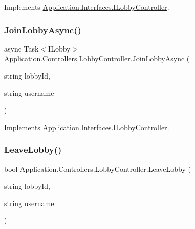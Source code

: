 Implements \mbox{\hyperlink{interface_application_1_1_interfaces_1_1_i_lobby_controller_a17c37ec6dbb98ab07deb4e4f9800a68e}{Application.\+Interfaces.\+I\+Lobby\+Controller}}.

\mbox{\label{class_application_1_1_controllers_1_1_lobby_controller_af9484a4c054717c0975175d93e45149c}} 
\subsubsection{\texorpdfstring{Join\+Lobby\+Async()}{JoinLobbyAsync()}}
{\footnotesize\ttfamily async Task$<$I\+Lobby$>$ Application.\+Controllers.\+Lobby\+Controller.\+Join\+Lobby\+Async (\begin{DoxyParamCaption}\item[{string}]{lobby\+Id,  }\item[{string}]{username }\end{DoxyParamCaption})}



Implements \mbox{\hyperlink{interface_application_1_1_interfaces_1_1_i_lobby_controller_aba87a2245b2c274cf977aeaf193eef73}{Application.\+Interfaces.\+I\+Lobby\+Controller}}.

\mbox{\label{class_application_1_1_controllers_1_1_lobby_controller_aa075018713d8ac7fdf84cf6349e2f10d}} 
\subsubsection{\texorpdfstring{Leave\+Lobby()}{LeaveLobby()}}
{\footnotesize\ttfamily bool Application.\+Controllers.\+Lobby\+Controller.\+Leave\+Lobby (\begin{DoxyParamCaption}\item[{string}]{lobby\+Id,  }\item[{string}]{username }\end{DoxyParamCaption})}




